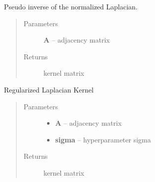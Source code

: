 \documentclass[letterpaper,10pt,english]{sphinxmanual}
\begin{document}
\begin{fulllineitems}
\label{pyGPs.GraphExtensions:pyGPs.GraphExtensions.nodeKernels.psInvLapKernel}
Pseudo inverse of the normalized Laplacian.
\begin{quote}\begin{description}
\item[{Parameters}] \leavevmode
\textbf{A} -- adjacency matrix

\item[{Returns}] \leavevmode
kernel matrix

\end{description}\end{quote}

\end{fulllineitems}


\begin{fulllineitems}
\label{pyGPs.GraphExtensions:pyGPs.GraphExtensions.nodeKernels.regLapKernel}
Regularized Laplacian Kernel
\begin{quote}\begin{description}
\item[{Parameters}] \leavevmode\begin{itemize}
\item {} 
\textbf{A} -- adjacency matrix

\item {} 
\textbf{sigma} -- hyperparameter sigma

\end{itemize}

\item[{Returns}] \leavevmode
kernel matrix

\end{description}\end{quote}

\end{fulllineitems}

\end{document}
